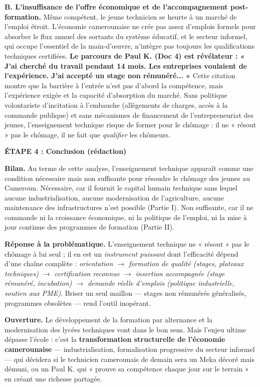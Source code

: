 \documentclass[11pt]{article}
\newcommand{\cle}[1]{{\popxbold\color{popdark}#1}}
\begin{document}
\begin{exoresolu}
\textbf{B. L'insuffisance de l'offre économique et de l'accompagnement post-formation.}
Même compétent, le jeune technicien se heurte à un marché de l'emploi étroit. L'économie camerounaise ne crée pas assez d'emplois formels pour absorber le flux annuel des sortants du système éducatif, et le secteur informel, qui occupe l'essentiel de la main-d'œuvre, n'intègre pas toujours les qualifications techniques certifiées. \textbf{Le parcours de Paul K. (Doc 4) est révélateur : « J'ai cherché du travail pendant 14 mois. Les entreprises voulaient de l'expérience. J'ai accepté un stage non rémunéré... »} Cette citation montre que la \cle{barrière à l'entrée} n'est pas d'abord la compétence, mais l'expérience exigée et la capacité d'absorption du marché. Sans politique volontariste d'incitation à l'embauche (allègements de charges, accès à la commande publique) et sans mécanismes de financement de l'entrepreneuriat des jeunes, l'enseignement technique risque de former pour le chômage : il ne « résout » pas le chômage, il ne fait que \emph{qualifier} les chômeurs.

\textbf{ÉTAPE 4 : Conclusion (rédaction)}

\textbf{Bilan.} Au terme de cette analyse, l'enseignement technique apparaît comme une \cle{condition nécessaire mais non suffisante} pour résoudre le chômage des jeunes au Cameroun. Nécessaire, car il fournit le capital humain technique sans lequel aucune industrialisation, aucune modernisation de l'agriculture, aucune maintenance des infrastructures n'est possible (Partie I). Non suffisante, car il ne commande ni la croissance économique, ni la politique de l'emploi, ni la mise à jour continue des programmes de formation (Partie II).

\textbf{Réponse à la problématique.} L'enseignement technique ne « résout » pas le chômage à lui seul ; il en est un \emph{instrument puissant} dont l'efficacité dépend d'une chaîne complète : \emph{orientation $\rightarrow$ formation de qualité (stages, plateaux techniques) $\rightarrow$ certification reconnue $\rightarrow$ insertion accompagnée (stage rémunéré, incubation) $\rightarrow$ demande réelle d'emplois (politique industrielle, soutien aux PME)}. Briser un seul maillon — stages non rémunérés généralisés, programmes obsolètes — rend l'outil inopérant.

\textbf{Ouverture.} Le développement de la \cle{formation par alternance} et la modernisation des lycées techniques vont dans le bon sens. Mais l'enjeu ultime dépasse l'école : c'est la \textbf{transformation structurelle de l'économie camerounaise} — industrialisation, formalisation progressive du secteur informel — qui décidera si le technicien camerounais de demain sera un Meka décoré mais démuni, ou un Paul K. qui « prouve sa compétence chaque jour sur le terrain » en créant une richesse partagée.
\end{exoresolu}
\end{document}
